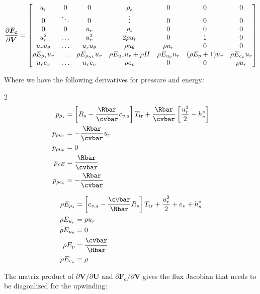 \documentclass[10pt]{article}
\begin{document}
\begin{flushleft}
\begin{equation*}
    \frac{\partial \boldsymbol{F_c}}{\partial \boldsymbol{V}} = \begin{bmatrix}
        u_r & 0 & 0 & \rho_s & 0 & 0 & 0 \\
        0 & \ddots & 0 & \vdots & 0 & 0 & 0 \\
        0 & 0 & u_r & \rho_s & 0 & 0 & 0 \\
        u_r^2 & \dots & u_r^2 & 2 \rho u_r & 0 & 1 & 0 \\
        u_r u_\theta & \dots & u_r u_\theta & \rho u_\theta & \rho u_r & 0 & 0 \\
        \rho E_{\rho_1} u_r & \dots & \rho E_{\rho_\text{NS}} u_r & \rho E_{u_r} u_r + \rho H & \rho E_{u_\theta} u_r & (\rho E_p + 1) u_r & \rho E_{e_v} u_r \\
        u_r e_{v} & \dots & u_r e_{v} & \rho e_{v} & 0 & 0 & \rho u_r \\
    \end{bmatrix}
\end{equation*}

Where we have the following derivatives for pressure and energy:

\begin{multicols}{2}
    \begin{align*}
    p_{\rho_s} &= \bb{R_s - \frac{\Rbar}{\cvbar} c_{v,s}} T_\text{tr} + \frac{\Rbar}{\cvbar} \bb{\frac{u_r^2}{2} - h_s^\circ}
    \\ p_{\rho u_r} &= -\frac{\Rbar}{\cvbar} u_r
    \\ p_{\rho u_\theta} &= 0
    \\ p_{\rho E} &= \frac{\Rbar}{\cvbar}
    \\ p_{\rho e_v} &= -\frac{\Rbar}{\cvbar}
\end{align*}

\begin{align*}
    \rho E_{\rho_s} &= \bb{c_{v,s} - \frac{\cvbar}{\Rbar} R_s} T_\text{tr} + \frac{u_r^2}{2} + e_v + h_s^\circ
    \\ \rho E_{u_r} &= \rho u_r
    \\ \rho E_{u_\theta} &= 0
    \\ \rho E_{p} &= \frac{\cvbar}{\Rbar}
    \\ \rho E_{e_v} &= \rho
\end{align*}
\end{multicols}


The matrix product of $\partial \boldsymbol{V} / \partial \boldsymbol{U}$ and $\partial \boldsymbol{F_c} / \partial \boldsymbol{V}$ gives the flux Jacobian that needs to be diagonlized for the upwinding:


\end{flushleft}
\end{document}
